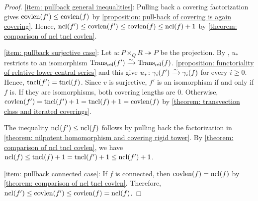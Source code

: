 \begin{proof}
\eqref{item: pullback general inequalities}: Pulling back a covering factorization gives $\operatorname{covlen}(f')\leq\operatorname{covlen}(f)$ by \cref{proposition: pull-back of covering is again covering}. Hence, $\operatorname{ncl}(f')\leq\operatorname{covlen}(f')\leq\operatorname{covlen}(f)\leq\operatorname{ncl}(f)+1$ by \cref{theorem: comparison of ncl tncl covlen}.

\eqref{item: pullback surjective case}: Let $u\colon P\times_Q R\twoheadrightarrow P$ be the projection. By \cite[Proposition~3.30]{preprint_yuki_tomoki_2026_relativization_of_symmetries_on_quandles}, $u_*$ restricts to an isomorphism $\operatorname{Trans_{rel}}(f')\xrightarrow{\sim}\operatorname{Trans_{rel}}(f)$. \cref{proposition: functoriality of relative lower central series} and this give $u_*\colon\gamma_{i}(f')\xrightarrow{\sim}\gamma_{i}(f)$ for every $i\geq0$. Hence, $\operatorname{tncl}(f')=\operatorname{tncl}(f)$. Since $v$ is surjective, $f'$ is an isomorphism if and only if $f$ is. If they are isomorphisms, both covering lengths are $0$. Otherwise, $\operatorname{covlen}(f')=\operatorname{tncl}(f')+1=\operatorname{tncl}(f)+1=\operatorname{covlen}(f)$ by \cref{theorem: transvection class and iterated coverings}.

The inequality $\operatorname{ncl}(f')\leq\operatorname{ncl}(f)$ follows by pulling back the factorization in \cref{theorem: nilpotent homomorphism and covering rigid tower}. By \cref{theorem: comparison of ncl tncl covlen}, we have $\operatorname{ncl}(f)\leq \operatorname{tncl}(f)+1=\operatorname{tncl}(f')+1\leq\operatorname{ncl}(f')+1$.

\eqref{item: pullback connected case}: If $f$ is connected, then $\operatorname{covlen}(f)=\operatorname{ncl}(f)$ by \cref{theorem: comparison of ncl tncl covlen}. Therefore, $\operatorname{ncl}(f')\leq\operatorname{covlen}(f')\leq\operatorname{covlen}(f)=\operatorname{ncl}(f)$.
\end{proof}





